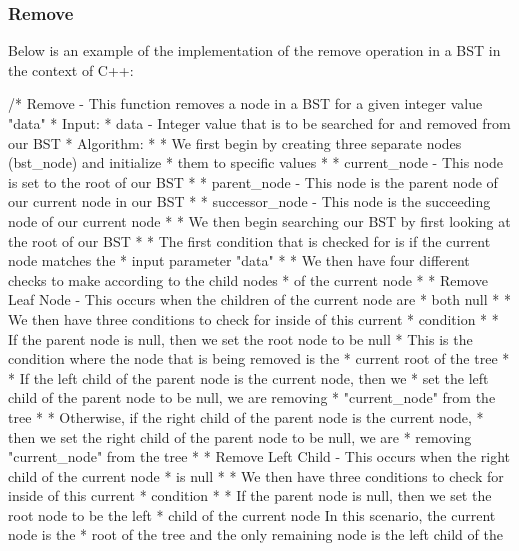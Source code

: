 \begin{highlight}

\subsubsection*{Remove}

Below is an example of the implementation of the remove operation in a BST in the context of C++:

\begin{code}
/*  Remove - This function removes a node in a BST for a given integer value "data"
*   Input:
*     data - Integer value that is to be searched for and removed from our BST
*   Algorithm:
*     * We first begin by creating three separate nodes (bst_node) and initialize 
*       them to specific values
*       * current_node - This node is set to the root of our BST
*       * parent_node - This node is the parent node of our current node in our BST
*       * successor_node - This node is the succeeding node of our current node
*     * We then begin searching our BST by first looking at the root of our BST
*     * The first condition that is checked for is if the current node matches the 
*       input parameter "data"
*       * We then have four different checks to make according to the child nodes 
*         of the current node
*       * Remove Leaf Node - This occurs when the children of the current node are 
*         both null
*         * We then have three conditions to check for inside of this current 
*           condition
*           * If the parent node is null, then we set the root node to be null
*             This is the condition where the node that is being removed is the 
*             current root of the tree
*           * If the left child of the parent node is the current node, then we 
*             set the left child of the parent node to be null, we are removing 
*             "current_node" from the tree
*           * Otherwise, if the right child of the parent node is the current node, 
*             then we set the right child of the parent node to be null, we are 
*             removing "current_node" from the tree
*       * Remove Left Child - This occurs when the right child of the current node 
*         is null
*         * We then have three conditions to check for inside of this current 
*           condition
*           * If the parent node is null, then we set the root node to be the left 
*             child of the current node In this scenario, the current node is the 
*             root of the tree and the only remaining node is the left child of the 

\end{code}
\end{highlight}
